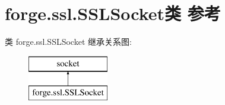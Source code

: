\hypertarget{classforge_1_1ssl_1_1_s_s_l_socket}{}\section{forge.\+ssl.\+S\+S\+L\+Socket类 参考}
\label{classforge_1_1ssl_1_1_s_s_l_socket}
类 forge.\+ssl.\+S\+S\+L\+Socket 继承关系图\+:\begin{figure}[H]
\begin{center}
\leavevmode
\includegraphics[height=2.000000cm]{classforge_1_1ssl_1_1_s_s_l_socket}
\end{center}
\end{figure}
